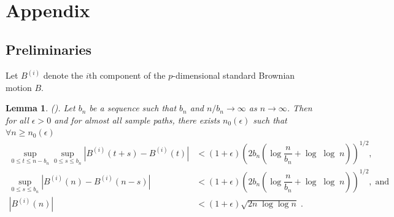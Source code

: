 \documentclass[11pt]{article}
\newtheorem{lemma}{Lemma}
\theoremstyle{remark}
\begin{document}

\section{Appendix}  \label{sec:appendix}
\subsection{Preliminaries} \label{apdx:preliminaries}

Let $B^{(i)}$ denote the $i$th component of the $p$-dimensional standard Brownian motion $B$.
\begin{lemma}
\label{lemma: brownian}
(\cite{csorgo1981strong}). Let $b_n$ be a sequence such that $b_n$ and $n/b_n \to \infty$ as $n \to \infty$. Then for all $\epsilon > 0$ and for almost all sample paths, there exists $n_{0}\left(\epsilon\right)$ such that $\forall n\geq n_{0}(\epsilon)$
\begin{align*}
 \sup_{0\leq t \leq n-b_n}\sup_{0 \leq s \leq b_n} \left| B^{\left(i\right)}\left(t+s\right) - B^{\left(i\right)}\left(t\right) \right| & < \left(1+ \epsilon\right)\left(2b_n\left(\log\dfrac{n}{b_n} + \log\; \log\; n\right)\right)^{1/2} , \\ 
  \sup_{0 \leq s \leq b_n} \left|B^{\left(i\right)}\left(n\right) - B^{\left(i\right)}\left(n - s\right)\right|& < \left(1+ \epsilon\right)\left(2b_n\left(\log\dfrac{n}{b_n} + \log\;\log\;n\right)\right)^{1/2} , \; \textrm{and} \\ 
  \left|B^{\left(i\right)}\left(n\right)\right|& < \left(1+\epsilon\right)\sqrt{2n\;\log \log n} \; . 
\end{align*}
%
\end{lemma}


\end{document}
